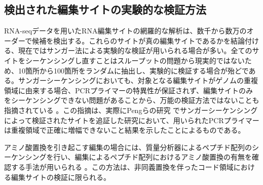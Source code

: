 \subsection{検出された編集サイトの実験的な検証方法}
RNA-seqデータを用いたRNA編集サイトの網羅的な解析は、数千から数万のオーダーで候補を検出する。これらのサイトが真の編集サイトであるかを結論付ける、現在ではサンガー法による実験的な検証が用いられる場合が多い。全てのサイトをシーケンシングし直すことはスループットの問題から現実的ではないため、10箇所から100箇所をランダムに抽出し、実験的に検証する場合が殆どである。サンガーシーケンシングにおいても、対象となる編集サイトがゲノムの重複領域に由来する場合、PCRプライマーの特異性が保証されず、編集サイトのみをシーケンシングできない問題があることから、万能の検証方法ではないことも指摘されている \citep{Piskol:2013aa}。この指摘は、実際にPengらの研究 \citep{Peng:2012aa}でサンガーシーケンシングによって検証されたサイトを追証した研究において、用いられたPCRプライマーは重複領域で正確に増幅できないこと結果を示したことによるものである。
\par
アミノ酸置換を引き起こす編集の場合には、質量分析器によるペプチド配列のシーケンシングを行い、編集によるペプチド配列におけるアミノ酸置換の有無を確認する手法が用いられる \citep{pmid21596952}。この方法は、非同義置換を伴ったコード領域における編集サイトの検証に限られる。

